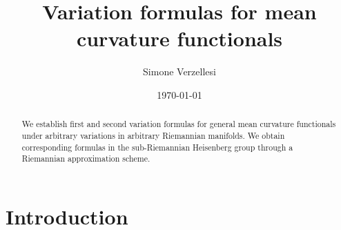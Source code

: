 \documentclass[11pt]{amsart}
\author[S.~Verzellesi]{Simone Verzellesi}
\title[Variation formulas for mean curvature functionals]{Variation formulas for mean curvature functionals}
\date{\today}
\theoremstyle{definition}
\theoremstyle{remark}
\numberwithin{equation}{section}
\begin{document}
\begin{abstract}

We establish first and second variation formulas for general mean curvature functionals under arbitrary variations in arbitrary Riemannian manifolds. We obtain corresponding formulas in the sub-Riemannian Heisenberg group through a Riemannian approximation scheme.
\end{abstract}
\maketitle
\section{Introduction}
%
%
\end{document}
